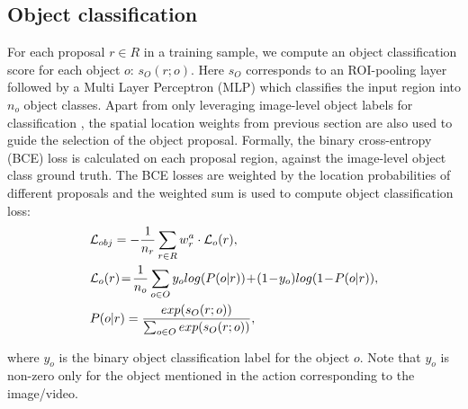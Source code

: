 \documentclass[10pt,twocolumn,letterpaper]{article}
\begin{document}
\subsection{Object classification}
\vspace{-0.2\baselineskip}
For each proposal $r \in R$ in a training sample, we compute an object classification score for each object $o$: $s_O(r;o)$. Here $s_O$ corresponds to an ROI-pooling layer followed by a Multi Layer Perceptron (MLP) which classifies the input region into $n_o$ object classes. Apart from only leveraging image-level object labels for classification \cite{bilen2016weakly,kantorov2016contextlocnet}, the spatial location weights from previous section are also used to guide the selection of the object proposal. Formally, the binary cross-entropy (BCE) loss is calculated on each proposal region, against the image-level object class ground truth. The BCE losses are weighted by the location probabilities of different proposals and the weighted sum is used to compute object classification loss:
\vspace{-0.3\baselineskip}
{\small
\begin{align}
\label{eqn:obj_cls_loss}
&\hua{L}_{obj} = -\frac{1}{n_r}\sum_{r \in R} w_r^{a} \cdot \hua{L}_{o} (r), \nonumber \\
&\hua{L}_{o}(r)\! =\! \frac{1}{n_o} \sum_{o \in O} y_o log(P(o|r))\!+\!(1\!-\!y_o)log(1\!-\!P(o|r)), \nonumber\\
&P(o|r) = \frac{exp(s_O(r;o))}{\sum_{o \in O}exp(s_O(r; o))},
\end{align}}
\vspace{-0.6\baselineskip}

\noindent where $y_o$ is the binary object classification label for the object $o$. Note that $y_o$ is non-zero only for the object mentioned in the action corresponding to the image/video.
\vspace{-0.2\baselineskip}
\end{document}
